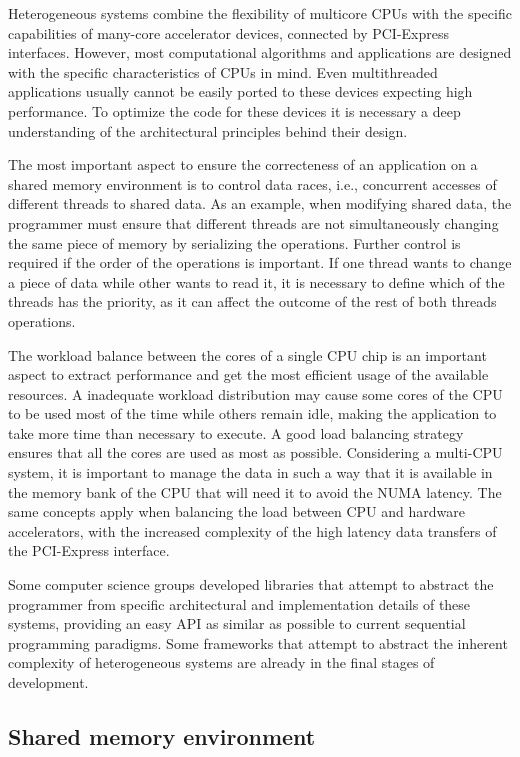Heterogeneous systems combine the flexibility of multicore CPUs with the specific capabilities of many-core accelerator devices, connected by PCI-Express interfaces. However, most computational algorithms and applications are designed with the specific characteristics of CPUs in mind. Even multithreaded applications usually cannot be easily ported to these devices expecting high performance. To optimize the code for these devices it is necessary a deep understanding of the architectural principles behind their design.

The most important aspect to ensure the correcteness of an application on a shared memory environment is to control data races, i.e., concurrent accesses of different threads to shared data. As an example, when modifying shared data, the programmer must ensure that different threads are not simultaneously changing the same piece of memory by serializing the operations. Further control is required if the order of the operations is important. If one thread wants to change a piece of data while other wants to read it, it is necessary to define which of the threads has the priority, as it can affect the outcome of the rest of both threads operations.

The workload balance between the cores of a single CPU chip is an important aspect to extract performance and get the most efficient usage of the available resources. A inadequate workload distribution may cause some cores of the CPU to be used most of the time while others remain idle, making the application to take more time than necessary to execute. A good load balancing strategy ensures that all the cores are used as most as possible. Considering a multi-CPU system, it is important to manage the data in such a way that it is available in the memory bank of the CPU that will need it to avoid the NUMA latency. The same concepts apply when balancing the load between CPU and hardware accelerators, with the increased complexity of the high latency data transfers of the PCI-Express interface.

Some computer science groups developed libraries that attempt to abstract the programmer from specific architectural and implementation details of these systems, providing an easy API as similar as possible to current sequential programming paradigms. Some frameworks that attempt to abstract the inherent complexity of heterogeneous systems are already in the final stages of development.

\subsection{Shared memory environment}

